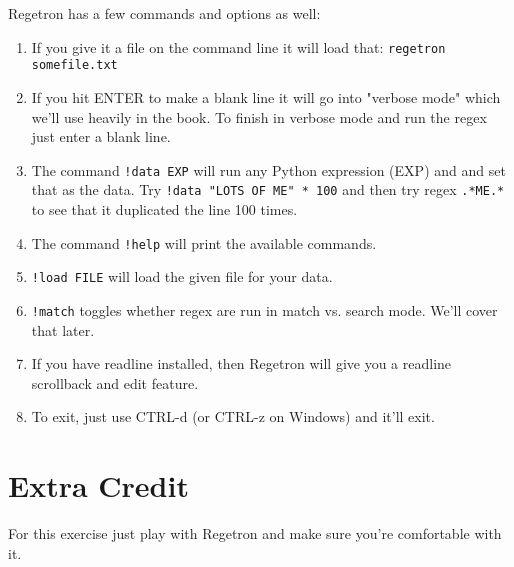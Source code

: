Regetron has a few commands and options as well:

\begin{enumerate}
\item If you give it a file on the command line it will load that: \verb|regetron somefile.txt|
\item If you hit ENTER to make a blank line it will go into "verbose mode" which we'll use heavily in the book.  To finish in verbose mode and run the regex
    just enter a blank line.
\item The command \verb|!data EXP| will run any Python expression (EXP) and and set that as the data.  Try \verb|!data "LOTS OF ME" * 100| and then
    try regex \verb|.*ME.*| to see that it duplicated the line 100 times.
\item The command \verb|!help| will print the available commands.
\item \verb|!load FILE| will load the given file for your data.
\item \verb|!match| toggles whether regex are run in match vs. search mode.  We'll cover that later.
\item If you have readline installed, then Regetron will give you a readline scrollback and edit feature.
\item To exit, just use CTRL-d (or CTRL-z on Windows) and it'll exit.
\end{enumerate}

\section{Extra Credit}

For this exercise just play with Regetron and make sure you're comfortable with it.


